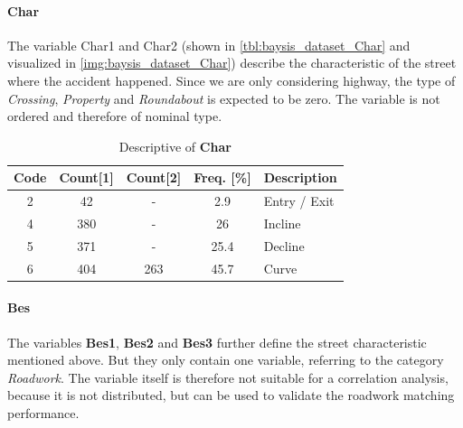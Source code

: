 \paragraph{Char}
\label{baysis_dataset_Char}
The variable Char1 and Char2 (shown in \autoref{tbl:baysis_dataset_Char} and visualized in \ref{img:baysis_dataset_Char}) describe the characteristic of the street where the accident happened. Since we are only considering highway, the type of \textit{Crossing}, \textit{Property} and \textit{Roundabout} is expected to be zero. The variable is not ordered and therefore of nominal type.  
\begin{table}[ht]
	\centering
	\small
	\begin{tabular}{c|c|c|c|l}
		\toprule
		Code & Count[1] & Count[2] & Freq. [\%] & Description \\ 
		\midrule
	    2 & 42	& -		& 2.9	& Entry / Exit \\
	    4 & 380	& -		& 26	& Incline \\
	    5 & 371	& -		& 25.4	& Decline \\
	    6 & 404	& 263	& 45.7	& Curve \\
		\bottomrule
	\end{tabular}
	\caption{Descriptive of \textbf{Char}}
	\label{tbl:baysis_dataset_Char}
	\vspace{-8mm}
\end{table}

\paragraph{Bes}
\label{baysis_dataset_Bes}
The variables \textbf{Bes1}, \textbf{Bes2} and \textbf{Bes3} further define the street characteristic mentioned above. But they only contain one variable, referring to the category \textit{Roadwork}. The variable itself is therefore not suitable for a correlation analysis, because it is not distributed, but can be used to validate the roadwork matching performance.

